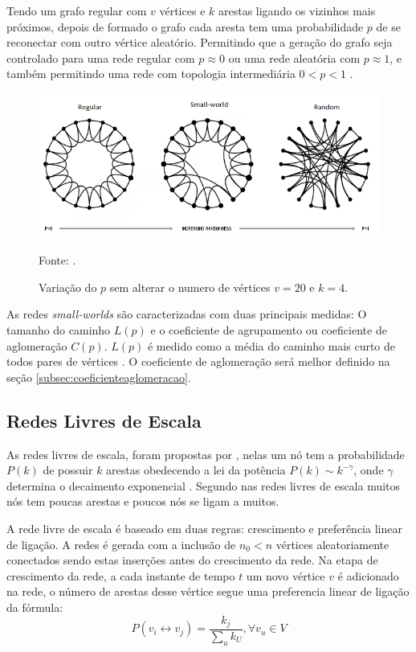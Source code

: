  Tendo um grafo regular com $v$ vértices e $k$ arestas ligando os vizinhos mais próximos, depois de formado o grafo cada aresta tem uma probabilidade $p$ de se reconectar com outro vértice aleatório. Permitindo que a geração do grafo seja controlado para uma rede regular com $p \approx 0$ ou uma rede aleatória com $p \approx 1$, e também permitindo uma rede com topologia intermediária $0 < p < 1$ \cite{lopes2011redes}.
 \begin{figure}[!htb]
 	\caption{Variação do $p$ sem alterar o numero de vértices $v = 20$ e $k = 4$.}
 	\begin{center}
 		\includegraphics[width=0.9\linewidth]{imagens/watts-sm}
 	\end{center}
 	\small{Fonte: \citet{watts1998collective}.}
 	\label{fig:watts-sm}
 \end{figure} 
 
 As redes \textit{small-worlds} são caracterizadas com duas principais medidas: O tamanho do caminho $L(p)$ e o coeficiente de agrupamento ou coeficiente de aglomeração $C(p)$. $L(p)$ é medido como a média do caminho mais curto de todos pares de vértices \cite{lopes2011redes}. O coeficiente de aglomeração será melhor definido na seção \ref{subsec:coeficienteaglomeracao}.
 
 \subsection{Redes Livres de Escala}
 As redes livres de escala, foram propostas por \citet{barabasi1999emergence}, nelas um nó tem a probabilidade \(P(k)\) de possuir \(k\) arestas obedecendo a lei da potência \(P(k) \sim k^{-\gamma}\), onde $\gamma$ determina o decaimento exponencial \cite{Antiqueira2005, lopes2011redes}. Segundo \citet{Viana2007} nas redes livres de escala muitos nós tem poucas arestas e poucos nós se ligam a muitos.
 
A rede livre de escala é baseado em duas regras: crescimento e preferência linear de ligação. A redes é gerada com a inclusão de $n_0 < n$ vértices aleatoriamente conectados sendo estas inserções antes do crescimento da rede. Na etapa de crescimento da rede, a cada instante de tempo $t$ um novo vértice $v$ é adicionado na rede, o número de arestas desse vértice segue uma preferencia linear de ligação da fórmula:
\[ P(v_i \leftrightarrow v_j) = \frac{k_j}{\sum_u k_U}, \forall v_u \in V \]


